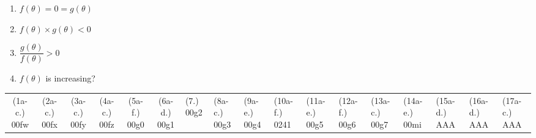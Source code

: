 \begin{eocexercises}{}
\begin{enumerate}[itemsep=9pt, label=\textbf{\arabic*}. ]
\begin{enumerate}[noitemsep, label=\textbf{(\alph*)} ]
      \begin{enumerate}[noitemsep, label=\textbf{\roman*}. ]
	    \item $f(\theta)=0=g(\theta)$
	    \item $f(\theta)\times g(\theta)<0$
	    \item $\dfrac{g(\theta)}{f(\theta)}>0$
	    \item $f(\theta)$ is increasing?
  \end{enumerate}
  \end{enumerate}
  \end{enumerate}
\practiceinfo
\par 
\par \begin{tabular}[h]{cccccc}
(1a-c.) 00fw&  (2a-c.) 00fx&  (3a-c.) 00fy&  (4a-c.) 00fz&  (5a-f.) 00g0&  (6a-d.) 00g1&  (7.) 00g2&  (8a-c.) 00g3& (9a-e.) 00g4& (10a-f.) 0241 & (11a-e.) 00g5& (12a-f.) 00g6& (13a-c.) 00g7& (14a-e.) 00mi& (15a-d.) AAA& (16a-d.) AAA& (17a-c.) AAA
\end{tabular}
\end{eocexercises}
